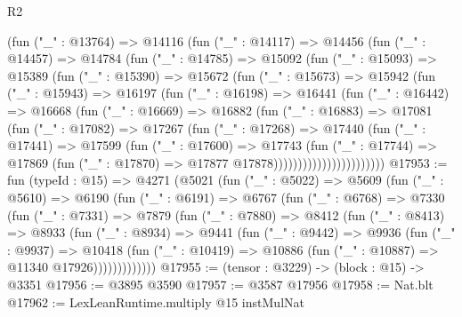 \begin{lexlean}{R2}
\begin{coremodule}
              (fun ("_" : @13764) =>
              @14116
                (fun ("_" : @14117) =>
                @14456
                  (fun ("_" : @14457) =>
                  @14784
                    (fun ("_" : @14785) =>
                    @15092
                      (fun ("_" : @15093) =>
                      @15389
                        (fun ("_" : @15390) =>
                        @15672
                          (fun ("_" : @15673) =>
                          @15942
                            (fun ("_" : @15943) =>
                            @16197
                              (fun ("_" : @16198) =>
                              @16441
                                (fun ("_" : @16442) =>
                                @16668
                                  (fun ("_" : @16669) =>
                                  @16882
                                    (fun ("_" : @16883) =>
                                    @17081
                                      (fun ("_" : @17082) =>
                                      @17267
                                        (fun ("_" : @17268) =>
                                        @17440
                                          (fun ("_" : @17441) =>
                                          @17599
                                            (fun ("_" : @17600) =>
                                            @17743
                                              (fun ("_" : @17744) =>
                                              @17869
                                                (fun ("_" : @17870) =>
                                                @17877 @17878)))))))))))))))))))))))
@17953 := fun (typeId : @15) =>
  @4271
    (@5021
      (fun ("_" : @5022) =>
      @5609
        (fun ("_" : @5610) =>
        @6190
          (fun ("_" : @6191) =>
          @6767
            (fun ("_" : @6768) =>
            @7330
              (fun ("_" : @7331) =>
              @7879
                (fun ("_" : @7880) =>
                @8412
                  (fun ("_" : @8413) =>
                  @8933
                    (fun ("_" : @8934) =>
                    @9441
                      (fun ("_" : @9442) =>
                      @9936
                        (fun ("_" : @9937) =>
                        @10418
                          (fun ("_" : @10419) =>
                          @10886 (fun ("_" : @10887) => @11340 @17926)))))))))))))
@17955 := (tensor : @3229) -> (block : @15) -> @3351
@17956 := @3895 @3590
@17957 := @3587 @17956
@17958 := Nat.blt
@17962 := LexLeanRuntime.multiply @15 instMulNat

\end{coremodule}
\end{lexlean}
